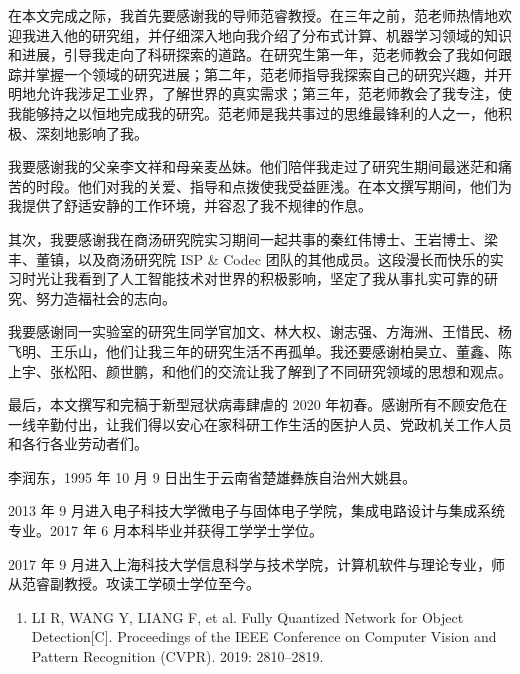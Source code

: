 \documentclass[
  fontset = source,
]{shtthesis}
\begin{document}
\backmatter
\begin{acknowledgement}
在本文完成之际，我首先要感谢我的导师范睿教授。在三年之前，范老师热情地欢迎我进入他的研究组，并仔细深入地向我介绍了分布式计算、机器学习领域的知识和进展，引导我走向了科研探索的道路。在研究生第一年，范老师教会了我如何跟踪并掌握一个领域的研究进展；第二年，范老师指导我探索自己的研究兴趣，并开明地允许我涉足工业界，了解世界的真实需求；第三年，范老师教会了我专注，使我能够持之以恒地完成我的研究。范老师是我共事过的思维最锋利的人之一，他积极、深刻地影响了我。

我要感谢我的父亲李文祥和母亲麦丛妹。他们陪伴我走过了研究生期间最迷茫和痛苦的时段。他们对我的关爱、指导和点拨使我受益匪浅。在本文撰写期间，他们为我提供了舒适安静的工作环境，并容忍了我不规律的作息。

其次，我要感谢我在商汤研究院实习期间一起共事的秦红伟博士、王岩博士、梁丰、董镇，以及商汤研究院 ISP \& Codec 团队的其他成员。这段漫长而快乐的实习时光让我看到了人工智能技术对世界的积极影响，坚定了我从事扎实可靠的研究、努力造福社会的志向。

我要感谢同一实验室的研究生同学官加文、林大权、谢志强、方海洲、王惜民、杨飞明、王乐山，他们让我三年的研究生活不再孤单。我还要感谢柏昊立、董鑫、陈上宇、张松阳、颜世鹏，和他们的交流让我了解到了不同研究领域的思想和观点。

最后，本文撰写和完稿于新型冠状病毒肆虐的 2020 年初春。感谢所有不顾安危在一线辛勤付出，让我们得以安心在家科研工作生活的医护人员、党政机关工作人员和各行各业劳动者们。
\end{acknowledgement}

\begin{resume}
李润东，1995 年 10 月 9 日出生于云南省楚雄彝族自治州大姚县。

2013 年 9 月进入电子科技大学微电子与固体电子学院，集成电路设计与集成系统专业。2017 年 6 月本科毕业并获得工学学士学位。

2017 年 9 月进入上海科技大学信息科学与技术学院，计算机软件与理论专业，师从范睿副教授。攻读工学硕士学位至今。
\end{resume}

\begin{publications}
\begin{enumerate}
  \item LI R, WANG Y, LIANG F, et al. Fully Quantized Network for Object Detection[C]. Proceedings of the IEEE Conference on Computer Vision and Pattern Recognition (CVPR). 2019: 2810--2819.
\end{enumerate}
\end{publications}
\end{document}
